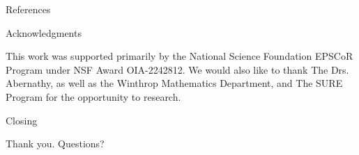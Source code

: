 \documentclass[9pt, dvipsnames,compress,aspectratio=169]{beamer}
\begin{document}
\begin{frame}{References}
\printbibliography
\end{frame}

\begin{frame}{Acknowledgments}
    \begin{block}{}
        \begin{center}
            This work was supported primarily by the National Science Foundation EPSCoR Program under NSF Award OIA-2242812. We would also like to thank The Drs. Abernathy, as well as the Winthrop Mathematics Department, and The SURE Program for the opportunity to research.
        \end{center}
    \end{block}
\end{frame}

\begin{frame}{Closing}
    \begin{block}{}
       \centering Thank you. Questions?
    \end{block}
\end{frame}
\end{document}
